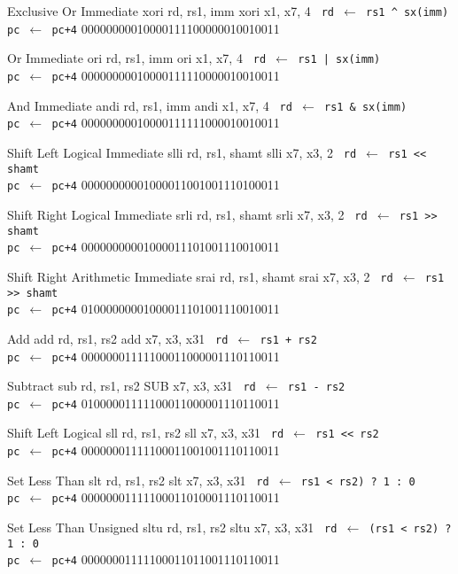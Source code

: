 \TDrawInsnTypeIPicture
{Exclusive Or Immediate}
{xori rd, rs1, imm}
{xori x1, x7, 4}
{\tt%
rd $\leftarrow$ rs1 \^{} sx(imm)\\
pc $\leftarrow$ pc+4}
{00000000010000111100000010010011}

\TDrawInsnTypeIPicture
{Or Immediate}
{ori rd, rs1, imm}
{ori x1, x7, 4}
{\tt%
rd $\leftarrow$ rs1 | sx(imm)\\
pc $\leftarrow$ pc+4}
{00000000010000111110000010010011}

\TDrawInsnTypeIPicture
{And Immediate}
{andi rd, rs1, imm}
{andi x1, x7, 4}
{\tt%
rd $\leftarrow$ rs1 \& sx(imm)\\
pc $\leftarrow$ pc+4}
{00000000010000111111000010010011}


\TDrawInsnTypeRShiftPicture
{Shift Left Logical Immediate}
{slli rd, rs1, shamt}
{slli x7, x3, 2}
{\tt%
rd $\leftarrow$ rs1 << shamt\\
pc $\leftarrow$ pc+4}
{00000000001000011001001110100011}


\TDrawInsnTypeRShiftPicture
{Shift Right Logical Immediate}
{srli rd, rs1, shamt}
{srli x7, x3, 2}
{\tt%
rd $\leftarrow$ rs1 >> shamt\\
pc $\leftarrow$ pc+4}
{00000000001000011101001110010011}

\TDrawInsnTypeRShiftPicture
{Shift Right Arithmetic Immediate}
{srai rd, rs1, shamt}
{srai x7, x3, 2}
{\tt%
rd $\leftarrow$ rs1 >> shamt\\
pc $\leftarrow$ pc+4}
{01000000001000011101001110010011}

\TDrawInsnTypeRPicture
{Add}
{add rd, rs1, rs2}
{add x7, x3, x31}
{\tt%
rd $\leftarrow$ rs1 + rs2\\
pc $\leftarrow$ pc+4}
{00000001111100011000001110110011}

\TDrawInsnTypeRPicture
{Subtract}
{sub rd, rs1, rs2}
{SUB x7, x3, x31}
{\tt%
rd $\leftarrow$ rs1 - rs2\\
pc $\leftarrow$ pc+4}
{01000001111100011000001110110011}

\TDrawInsnTypeRPicture
{Shift Left Logical}
{sll rd, rs1, rs2}
{sll x7, x3, x31}
{\tt%
rd $\leftarrow$ rs1 << rs2\\
pc $\leftarrow$ pc+4}
{00000001111100011001001110110011}

\TDrawInsnTypeRPicture
{Set Less Than}
{slt rd, rs1, rs2}
{slt x7, x3, x31}
{\tt%
rd $\leftarrow$ rs1 < rs2) ? 1 : 0\\
pc $\leftarrow$ pc+4}
{00000001111100011010001110110011}

\TDrawInsnTypeRPicture
{Set Less Than Unsigned}
{sltu rd, rs1, rs2}
{sltu x7, x3, x31}
{\tt%
rd $\leftarrow$ (rs1 < rs2) ? 1 : 0\\
pc $\leftarrow$ pc+4}
{00000001111100011011001110110011}

